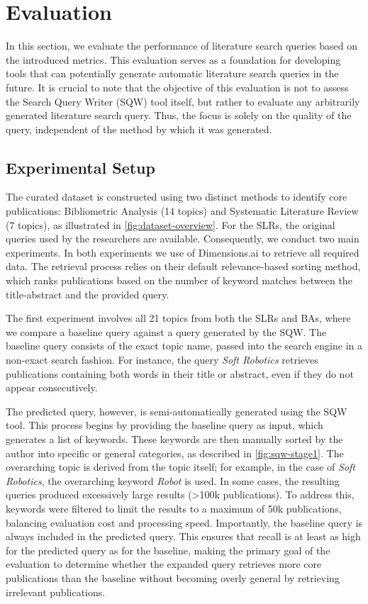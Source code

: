 \chapter{Evaluation}\label{ch:eval}
In this section, we evaluate the performance of literature search queries based on the introduced metrics. This evaluation serves as a foundation for developing tools that can potentially generate automatic literature search queries in the future. It is crucial to note that the objective of this evaluation is not to assess the Search Query Writer (SQW) tool itself, but rather to evaluate any arbitrarily generated literature search query. Thus, the focus is solely on the quality of the query, independent of the method by which it was generated.

\section{Experimental Setup}

The curated dataset is constructed using two distinct methods to identify core publications: Bibliometric Analysis (14 topics) and Systematic Literature Review (7 topics), as illustrated in \autoref{fig:dataset-overview}. For the SLRs, the original queries used by the researchers are available. Consequently, we conduct two main experiments. In both experiments we use of Dimensions.ai to retrieve all required data. The retrieval process relies on their default relevance-based sorting method, which ranks publications based on the number of keyword matches between the title-abstract and the provided query.

The first experiment involves all 21 topics from both the SLRs and BAs, where we compare a baseline query against a query generated by the SQW. The baseline query consists of the exact topic name, passed into the search engine in a non-exact search fashion. For instance, the query \textit{Soft Robotics} retrieves publications containing both words in their title or abstract, even if they do not appear consecutively.

The predicted query, however, is semi-automatically generated using the SQW tool. This process begins by providing the baseline query as input, which generates a list of keywords. These keywords are then manually sorted by the author into specific or general categories, as described in \autoref{fig:sqw-stage1}. The overarching topic is derived from the topic itself; for example, in the case of \textit{Soft Robotics}, the overarching keyword \textit{Robot} is used. In some cases, the resulting queries produced excessively large results (>100k publications). To address this, keywords were filtered to limit the results to a maximum of 50k publications, balancing evaluation cost and processing speed. Importantly, the baseline query is always included in the predicted query. This ensures that recall is at least as high for the predicted query as for the baseline, making the primary goal of the evaluation to determine whether the expanded query retrieves more core publications than the baseline without becoming overly general by retrieving irrelevant publications.

